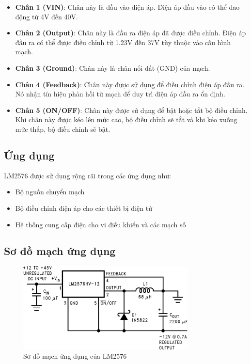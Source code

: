             \begin{itemize}
                \item \textbf{Chân 1 (VIN)}: Chân này là đầu vào điện áp. Điện áp đầu vào có thể dao động từ 4V đến 40V.
                \item \textbf{Chân 2 (Output)}: Chân này là đầu ra điện áp đã được điều chỉnh. Điện áp đầu ra có thể được điều chỉnh từ 1.23V đến 37V tùy thuộc vào cấu hình mạch.
                \item \textbf{Chân 3 (Ground)}: Chân này là chân nối đất (GND) của mạch.
                \item \textbf{Chân 4 (Feedback)}: Chân này được sử dụng để điều chỉnh điện áp đầu ra. Nó nhận tín hiệu phản hồi từ mạch để duy trì điện áp đầu ra ổn định.
                \item \textbf{Chân 5 (ON/OFF)}: Chân này được sử dụng để bật hoặc tắt bộ điều chỉnh. Khi chân này được kéo lên mức cao, bộ điều chỉnh sẽ tắt và khi kéo xuống mức thấp, bộ điều chỉnh sẽ bật.
            \end{itemize}

            
        \subsection{Ứng dụng}
            LM2576 được sử dụng rộng rãi trong các ứng dụng như:
            \begin{itemize}
                \item Bộ nguồn chuyển mạch
                \item Bộ điều chỉnh điện áp cho các thiết bị điện tử
                \item Hệ thống cung cấp điện cho vi điều khiển và các mạch số
            \end{itemize}
            
        \subsection{Sơ đồ mạch ứng dụng}
            \begin{figure}[H]
                \centering
                \includegraphics[width=0.8\textwidth]{pictures/lm2576_application_circuit.png}
                \caption{Sơ đồ mạch ứng dụng của LM2576}
            \end{figure}

